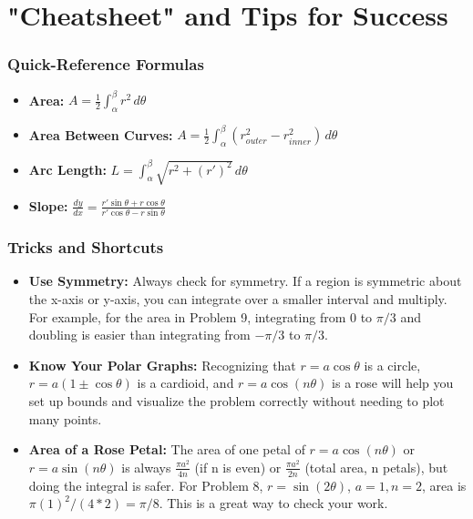 \documentclass{article}
\begin{document}
\part{"Cheatsheet" and Tips for Success}

\section{Quick-Reference Formulas}
\begin{itemize}
    \item \textbf{Area:} $A = \frac{1}{2} \int_{\alpha}^{\beta} r^2 \,d\theta$
    \item \textbf{Area Between Curves:} $A = \frac{1}{2} \int_{\alpha}^{\beta} (r_{outer}^2 - r_{inner}^2) \,d\theta$
    \item \textbf{Arc Length:} $L = \int_{\alpha}^{\beta} \sqrt{r^2 + (r')^2} \,d\theta$
    \item \textbf{Slope:} $\frac{dy}{dx} = \frac{r' \sin\theta + r \cos\theta}{r' \cos\theta - r \sin\theta}$
\end{itemize}

\section{Tricks and Shortcuts}
\begin{itemize}
    \item \textbf{Use Symmetry:} Always check for symmetry. If a region is symmetric about the x-axis or y-axis, you can integrate over a smaller interval and multiply. For example, for the area in Problem 9, integrating from $0$ to $\pi/3$ and doubling is easier than integrating from $-\pi/3$ to $\pi/3$.
    \item \textbf{Know Your Polar Graphs:} Recognizing that $r=a\cos\theta$ is a circle, $r=a(1\pm\cos\theta)$ is a cardioid, and $r=a\cos(n\theta)$ is a rose will help you set up bounds and visualize the problem correctly without needing to plot many points.
    \item \textbf{Area of a Rose Petal:} The area of one petal of $r=a\cos(n\theta)$ or $r=a\sin(n\theta)$ is always $\frac{\pi a^2}{4n}$ (if n is even) or $\frac{\pi a^2}{2n}$ (total area, n petals), but doing the integral is safer. For Problem 8, $r=\sin(2\theta)$, $a=1, n=2$, area is $\pi(1)^2 / (4*2) = \pi/8$. This is a great way to check your work.
\end{itemize}
\end{document}
